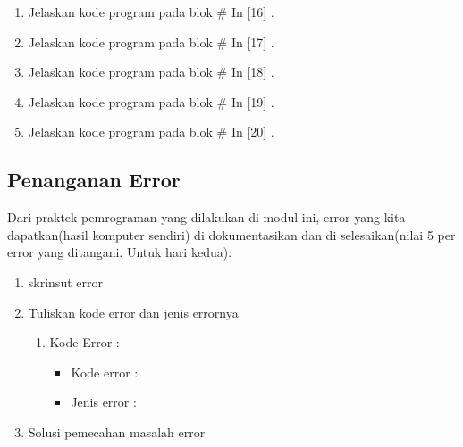 \begin{enumerate}
\item Jelaskan kode program pada blok \# In [16] .

\item Jelaskan kode program pada blok \# In [17] .

\item Jelaskan kode program pada blok \# In [18] .

\item Jelaskan kode program pada blok \# In [19] .

\item Jelaskan kode program pada blok \# In [20] .


\end{enumerate}


\subsection{Penanganan Error}
Dari praktek pemrograman yang dilakukan di modul ini, error yang kita dapatkan(hasil komputer sendiri) di dokumentasikan dan di selesaikan(nilai 5 per error yang ditangani. Untuk hari kedua):

\begin{enumerate}
	\item skrinsut error
		
		
	\item Tuliskan kode error dan jenis errornya
		\begin{enumerate}
		\item Kode Error  :
			\begin{itemize}
				\item Kode error : 
				\item Jenis error :
			\end{itemize}
		\end{enumerate}

	\item Solusi pemecahan masalah error
		
		
\end{enumerate}